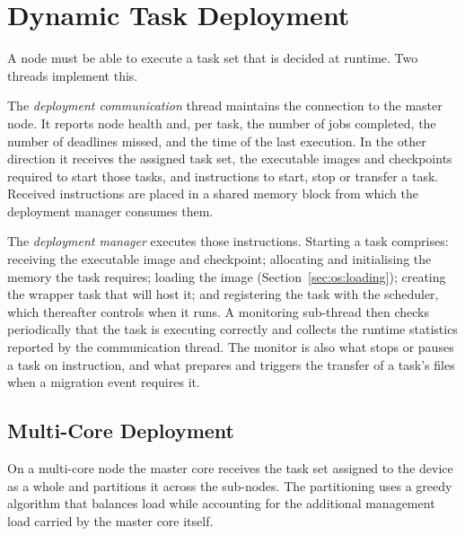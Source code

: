 \section{Dynamic Task Deployment}\label{sec:os:deployment}

A node must be able to execute a task set that is decided at runtime. Two
threads implement this.

The \emph{deployment communication} thread maintains the connection to the
master node. It reports node health and, per task, the number of jobs
completed, the number of deadlines missed, and the time of the last execution.
In the other direction it receives the assigned task set, the executable
images and checkpoints required to start those tasks, and instructions to
start, stop or transfer a task. Received instructions are placed in a shared
memory block from which the deployment manager consumes them.

The \emph{deployment manager} executes those instructions. Starting a task
comprises: receiving the executable image and checkpoint; allocating and
initialising the memory the task requires; loading the image
(Section~\ref{sec:os:loading}); creating the wrapper task that will host it;
and registering the task with the scheduler, which thereafter controls when it
runs. A monitoring sub-thread then checks periodically that the task is
executing correctly and collects the runtime statistics reported by the
communication thread. The monitor is also what stops or pauses a task on
instruction, and what prepares and triggers the transfer of a task's files
when a migration event requires it.

\subsection{Multi-Core Deployment}\label{subsec:os:multicore}

On a multi-core node the master core receives the task set assigned to the
device as a whole and partitions it across the sub-nodes. The partitioning uses a
greedy algorithm that balances load while accounting for the additional
management load carried by the master core itself.

